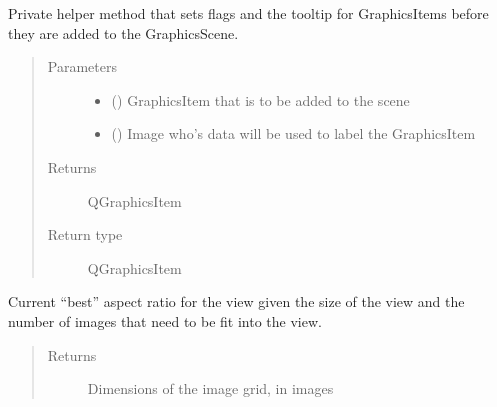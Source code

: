 \documentclass[letterpaper,10pt,english]{sphinxmanual}
\begin{document}
\begin{fulllineitems}
\begin{fulllineitems}
\label{\detokenize{polo.widgets:polo.widgets.plate_viewer.plateViewer._set_prerender_info}}
Private helper method that sets flags and the tooltip for
GraphicsItems before they are added to the GraphicsScene.
\begin{quote}\begin{description}
\item[{Parameters}] \leavevmode\begin{itemize}
\item {} 
 () \textendash{} GraphicsItem that is to be added to the scene

\item {} 
 ({\hyperref[\detokenize{polo.crystallography:polo.crystallography.image.Image}]{}}) \textendash{} Image who’s data will be used to label the GraphicsItem

\end{itemize}

\item[{Returns}] \leavevmode
QGraphicsItem

\item[{Return type}] \leavevmode
QGraphicsItem

\end{description}\end{quote}

\end{fulllineitems}


\begin{fulllineitems}
\label{\detokenize{polo.widgets:polo.widgets.plate_viewer.plateViewer.aspect_ratio}}
Current “best” aspect ratio for the view given the size of the
view and the number of images that need to be fit into the view.
\begin{quote}\begin{description}
\item[{Returns}] \leavevmode
Dimensions of the image grid, in images


\end{description}
\end{quote}
\end{fulllineitems}
\end{fulllineitems}
\end{document}
